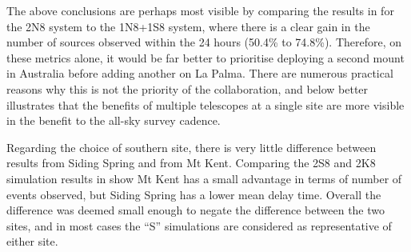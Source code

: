 \begin{colsection}
\begin{colsection}
The above conclusions are perhaps most visible by comparing the results in  for the 2N8 system to the 1N8+1S8 system, where there is a clear gain in the number of sources observed within the 24 hours (50.4\% to 74.8\%). Therefore, on these metrics alone, it would be far better to prioritise deploying a second mount in Australia before adding another on La Palma. There are numerous practical reasons why this is not the priority of the collaboration, and  below better illustrates that the benefits of multiple telescopes at a single site are more visible in the benefit to the all-sky survey cadence.

Regarding the choice of southern site, there is very little difference between results from Siding Spring and from Mt Kent. Comparing the 2S8 and 2K8 simulation results in  show Mt Kent has a small advantage in terms of number of events observed, but Siding Spring has a lower mean delay time. Overall the difference was deemed small enough to negate the difference between the two sites, and in most cases the ``S'' simulations are considered as representative of either site.


\end{colsection}
\end{colsection}
